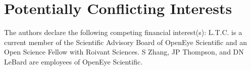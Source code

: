 \section{Potentially Conflicting Interests}
The authors declare the following competing financial interest(s): L.T.C. is a current member of the Scientific Advisory Board of OpenEye Scientific and an Open Science Fellow with Roivant Sciences. S Zhang, JP Thompson, and DN LeBard are employees of OpenEye Scientific.